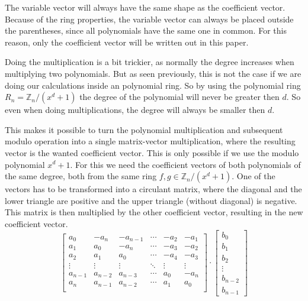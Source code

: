 The variable vector will always have the same shape as the coefficient vector. Because of the ring properties, the variable vector can always be placed outside the parentheses, since all polynomials have the same one in common. For this reason, only the coefficient vector will be written out in this paper.

Doing the multiplication is a bit trickier, as normally the degree increases when multiplying two polynomials. But as seen previously, this is not the case if we are doing our calculations inside an polynomial ring. So by using the polynomial ring $R_n = \mathbb{Z}_n/(x^d+1)$ the degree of the polynomial will never be greater then $d$. So even when doing multiplications, the degree will always be smaller then $d$.


This makes it possible to turn the polynomial multiplication and subsequent modulo operation into a single matrix-vector multiplication, where the resulting vector is the wanted coefficient vector. This is only possible if we use the modulo polynomial $x^d+1$. For this we need the coefficient vectors of both polynomials of the same degree, both from the same ring $f, g \in \mathbb{Z}_n/(x^d+1)$. One of the vectors has to be transformed into a circulant matrix, where the diagonal and the lower triangle are positive and the upper triangle (without diagonal) is negative. This matrix is then multiplied by the other coefficient vector, resulting in the new coefficient vector.
$$
  \begin{bmatrix}
    a_0     & -a_{n}  & -a_{n-1} & \cdots & -a_2   & -a_1   \\
    a_1     & a_0     & -a_{n}   & \cdots & -a_3   & -a_2   \\
    a_2     & a_1     & a_0      & \cdots & -a_4   & -a_3   \\
    \vdots  & \vdots  & \vdots   & \ddots & \vdots & \vdots \\
    a_{n-1} & a_{n-2} & a_{n-3}  & \cdots & a_0    & -a_{n} \\
    a_{n}   & a_{n-1} & a_{n-2}  & \cdots & a_1    & a_0    \\
  \end{bmatrix}
  \cdot
  \begin{bmatrix}
    b_0     \\
    b_1     \\
    b_2     \\
    \vdots  \\
    b_{n-2} \\
    b_{n-1}
  \end{bmatrix}
$$

